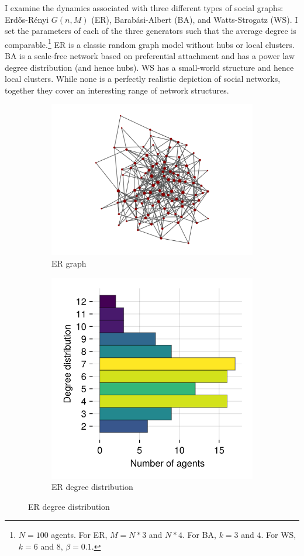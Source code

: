 \documentclass[]{article}
\begin{document}
I examine the dynamics associated with three different types of social graphs: Erdős-Rényi $G(n, M)$ (ER), Barabási-Albert (BA), and Watts-Strogatz (WS). I set the parameters of each of the three generators such that the average degree is comparable.\footnote{$N = 100$ agents. For ER, $M = N*3$ and $N*4$. For BA, $k = 3$ and $4$. For WS, $k = 6$ and $8$, $\beta = 0.1$.} ER is a classic random graph model without hubs or local clusters. BA is a scale-free network based on preferential attachment and has a power law degree distribution (and hence hubs). WS has a small-world structure and hence local clusters. While none is a perfectly realistic depiction of social networks, together they cover an interesting range of network structures.

\begin{figure}
	\begin{subfigure}{0.45\textwidth}
		\centering
		\includegraphics[width=0.8\linewidth]{../plots/g_erdosrenyi_n100_p3_s33} 
		\caption{ER graph}  \label{fig:subim11}
	\end{subfigure}
	\hspace{-1cm}
	\begin{subfigure}{0.45\textwidth}
		\centering
		\includegraphics[width=0.5\linewidth]{../plots/g_erdosrenyi_hist_degree_n100_p3_s33}
		\caption{ER degree distribution} \label{fig:subim12}
	\end{subfigure}
	

\end{figure}
\end{document}
